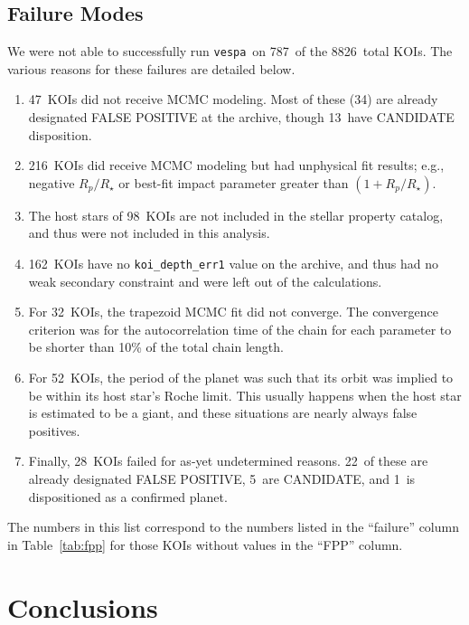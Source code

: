 \documentclass{emulateapj}
\newcommand{\Tab}[1]{Table~\ref{tab:#1}}
\newcommand{\tab}[1]{\Tab{#1}}
\newcommand{\sectlabel}[1]{\label{sect:#1}}
\newcommand{\ntotal}{8826}
\newcommand{\nfail}{787}
\newcommand{\nbadphot}{47} %
\newcommand{\nbadphotFP}{34}
\newcommand{\nbadphotCAND}{13}
\newcommand{\nbadrowemcmc}{216}
\newcommand{\nbadstellar}{98} %
\newcommand{\nbadsec}{162} %
\newcommand{\nbadtrapfit}{32}
\newcommand{\nbadroche}{52}
\newcommand{\nbadother}{28}
\newcommand{\nbadotherFP}{22}
\newcommand{\nbadotherCAND}{5}
\newcommand{\nbadotherCONF}{1}
\newcommand{\vespa}{\texttt{vespa}}
\begin{document}

\subsection{Failure Modes}
\sectlabel{failures}


We were not able to successfully run \vespa\ on \nfail\ of the
\ntotal\ total KOIs. The various reasons for these failures are
detailed below.  
\begin{enumerate}
\item \nbadphot\ KOIs did not receive MCMC modeling.  Most of these
  (\nbadphotFP) are already designated FALSE POSITIVE at the archive,
  though \nbadphotCAND\ have CANDIDATE disposition.
\item \nbadrowemcmc\ KOIs did receive MCMC modeling but had unphysical fit
  results; e.g., negative $R_p/R_\star$ or best-fit impact parameter
  greater than $(1 + R_p/R_\star)$.
\item The host stars of \nbadstellar\ KOIs are not included in the
   stellar property catalog, and thus were not
  included in this analysis.
\item \nbadsec\ KOIs have no \verb|koi_depth_err1| value on the archive,
  and thus had no weak secondary constraint and were left out of the
  calculations.
\item For \nbadtrapfit\ KOIs, the trapezoid MCMC fit did not converge.  The
  convergence criterion was for the autocorrelation time of the chain
  for each parameter to be shorter than 10\% of the total chain
  length.
\item For \nbadroche\ KOIs, the period of the planet was such that its
  orbit was implied to be within its host star's Roche limit.  This
  usually happens when the host star is estimated to be a giant, and
  these situations are nearly always false positives. 
\item Finally, \nbadother\ KOIs failed for as-yet undetermined
  reasons.  \nbadotherFP\ of these are already designated FALSE
  POSITIVE, \nbadotherCAND\ are CANDIDATE, and \nbadotherCONF\ is
  dispositioned as a confirmed planet.
\end{enumerate}
The numbers in this list correspond to the numbers listed in
the ``failure'' column in \tab{fpp} for those KOIs without values in
the ``FPP'' column.



\section{Conclusions}
\sectlabel{conclusions}
\end{document}
